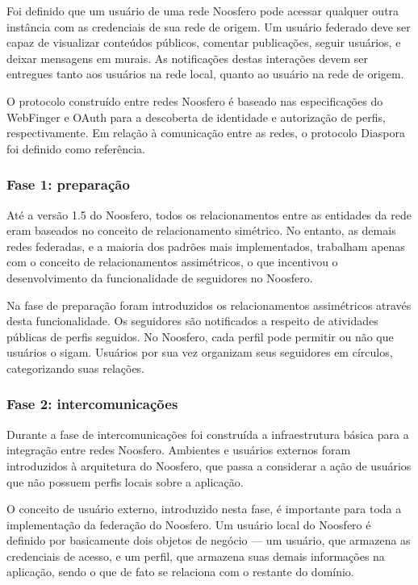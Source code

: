 Foi definido que um usuário de uma rede Noosfero pode acessar qualquer outra
instância com as credenciais de sua rede de origem. Um usuário federado deve ser
capaz de visualizar conteúdos públicos, comentar publicações, seguir usuários, e
deixar mensagens em murais. As notificações destas interações devem ser entregues
tanto aos usuários na rede local, quanto ao usuário na rede de origem.

O protocolo construído entre redes Noosfero é baseado nas especificações do
WebFinger e OAuth para a descoberta de identidade e autorização de perfis,
respectivamente. Em relação à comunicação entre as redes, o protocolo Diaspora foi
definido como referência. 

\subsubsection{Fase 1: preparação}

Até a versão 1.5 do Noosfero, todos os relacionamentos entre as entidades da rede
eram baseados no conceito de relacionamento simétrico. No entanto, as demais redes
federadas, e a maioria dos padrões mais implementados, trabalham apenas com o
conceito de relacionamentos assimétricos, o que incentivou o desenvolvimento da
funcionalidade de seguidores no Noosfero.

Na fase de preparação foram introduzidos os relacionamentos assimétricos através
desta funcionalidade. Os seguidores são notificados a respeito de atividades
públicas de perfis seguidos. No Noosfero, cada perfil pode permitir ou não que
usuários o sigam. Usuários por sua vez organizam seus seguidores em círculos,
categorizando suas relações.

\subsubsection{Fase 2: intercomunicações}

Durante a fase de intercomunicações foi construída a infraestrutura básica para a
integração entre redes Noosfero. Ambientes e usuários externos foram introduzidos à
arquitetura do Noosfero, que passa a considerar a ação de usuários que não possuem
perfis locais sobre a aplicação.

O conceito de usuário externo, introduzido nesta fase, é importante para toda a
implementação da federação do Noosfero. Um usuário local do Noosfero é definido por
basicamente dois objetos de negócio --- um usuário, que armazena as credenciais de
acesso, e um perfil, que armazena suas demais informações na aplicação, sendo o que
de fato se relaciona com o restante do domínio.

